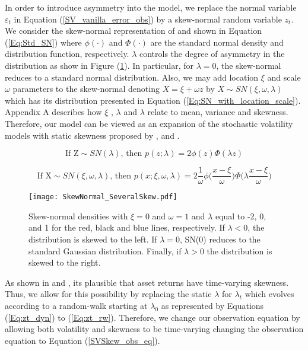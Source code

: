 \documentclass{article}
\begin{document}
In order to introduce asymmetry into the model, we replace the normal variable $\varepsilon_t$ in Equation (\ref{SV_vanilla_error_obs}) by a skew-normal random variable $z_t$. We consider the skew-normal representation of \cite{azzalini1985class} and \cite{azzalini2013skew} shown in Equation (\ref{Eq:Std_SN}) where $\phi (\cdot)$ and $\Phi (\cdot)$ are the standard normal density and distribution function, respectively. $\lambda$ controls the degree of asymmetry in the distribution as show in Figure (\ref{Fig:NS_multiple_lambda}). In particular, for $\lambda = 0$, the skew-normal reduces to a standard normal distribution. Also, we may add location $\xi$ and scale $\omega$ parameters to the skew-normal denoting  $X = \xi + \omega z$ by $ X \sim SN(\xi, \omega, \lambda)$ which has its distribution presented in Equation (\ref{Eq:SN_with_location_scale}). Appendix A describes how $\xi$ , $\lambda$ and $\lambda$ relate to mean, variance and skewness. Therefore, our model can be viewed as an expansion of the stochastic volatility models with static skewness proposed by \cite{nakajima2012stochastic}, \cite{nakajima2020skew} and \cite{li2020leverage}. 

\begin{equation}\label{Eq:Std_SN}
    \text{If Z} \sim SN(\lambda) \text{, then } p(z;\lambda) = 2 \phi(z) \Phi(\lambda z)
\end{equation}

\begin{equation}\label{Eq:SN_with_location_scale}
    \text{If X} \sim SN(\xi, \omega, \lambda) \text{, then } p(x; \xi, \omega, \lambda) = 2 \frac{1}{\omega} \phi \Big( \frac{x - \xi}{\omega} \Big) \Phi \Big(\lambda \frac{x - \xi}{\omega}  \Big)
\end{equation}

\begin{figure}[h!]
\centering
\texttt{[image: SkewNormal\_SeveralSkew.pdf]}
\caption{Skew-normal densities with $\xi = 0$ and $\omega =1$ and $\lambda$ equal to -2, 0, and 1 for the red, black and blue lines, respectively. If $\lambda < 0$, the distribution is skewed to the left. If $\lambda = 0$, SN(0) reduces to the standard Gaussian distribution. Finally, if $\lambda > 0$ the distribution is skewed to the right. } 
\label{Fig:NS_multiple_lambda}
\end{figure} 

As shown in \cite{bianchi2022taming} and \cite{carr2007stochastic}, its plausible that asset returns have time-varying skewness. Thus, we allow for this possibility by replacing the static $\lambda$ for $ \lambda_t$ which evolves according to a random-walk starting at $\lambda_0$ as represented by Equations (\ref{Eq:zt_dyn}) to (\ref{Eq:zt_rw}). Therefore, we change our observation equation by allowing both volatility and skewness to be time-varying changing the observation equation to Equation (\ref{SVSkew_obs_eq}).
\end{document}
